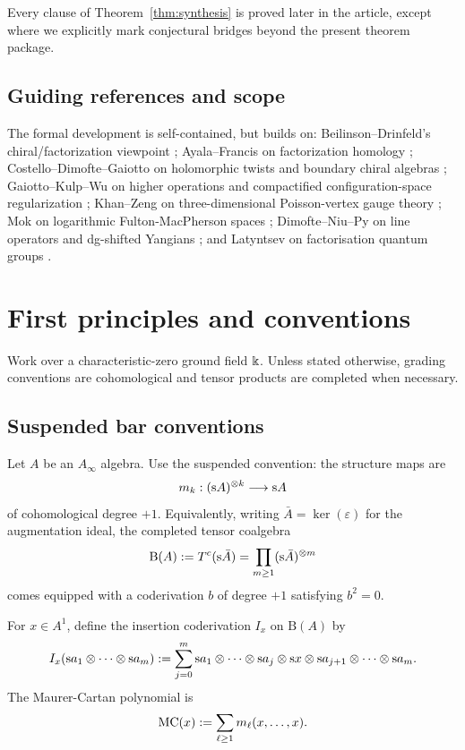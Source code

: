 Every clause of Theorem~\ref{thm:synthesis} is proved later in the article, except where we explicitly mark conjectural bridges beyond the present theorem package.

\subsection*{Guiding references and scope}
The formal development is self-contained, but builds on: Beilinson--Drinfeld's chiral/factorization viewpoint \cite{BD04}; Ayala--Francis on factorization homology \cite{AF15}; Costello--Dimofte--Gaiotto on holomorphic twists and boundary chiral algebras \cite{CDG20}; Gaiotto--Kulp--Wu on higher operations and compactified configuration-space regularization \cite{GKW25}; Khan--Zeng on three-dimensional Poisson-vertex gauge theory \cite{KZ25}; Mok on logarithmic Fulton-MacPherson spaces \cite{Mok25}; Dimofte--Niu--Py on line operators and dg-shifted Yangians \cite{DNP25}; and Latyntsev on factorisation quantum groups \cite{Lat23}.

\section{First principles and conventions}%

Work over a characteristic-zero ground field $\Bbbk$. Unless stated otherwise, grading conventions are cohomological and tensor products are completed when necessary.

\subsection{Suspended bar conventions}
Let $A$ be an $A_\infty$ algebra. Use the suspended convention: the structure maps are
\[
 m_k : (\mathrm s A)^{\otimes k} \longrightarrow \mathrm s A
\]
of cohomological degree $+1$. Equivalently, writing $\bar{A}=\ker(\varepsilon)$ for the augmentation ideal, the completed tensor coalgebra
\[
 \mathrm B(A):=T^c(\mathrm s \bar{A})=\prod_{m\ge 1}(\mathrm s \bar{A})^{\otimes m}
\]
comes equipped with a coderivation $b$ of degree $+1$ satisfying $b^2=0$.

For $x\in A^1$, define the insertion coderivation $I_x$ on $\mathrm B(A)$ by
\[
 I_x(\mathrm s a_1\otimes\cdots\otimes \mathrm s a_m)
 :=
 \sum_{j=0}^{m}
 \mathrm s a_1\otimes\cdots\otimes\mathrm s a_j\otimes\mathrm s x\otimes\mathrm s a_{j+1}\otimes\cdots\otimes\mathrm s a_m.
\]
The Maurer-Cartan polynomial is
\[
 \mathrm{MC}(x):=\sum_{\ell\ge 1} m_\ell(x,\dots,x).
\]

